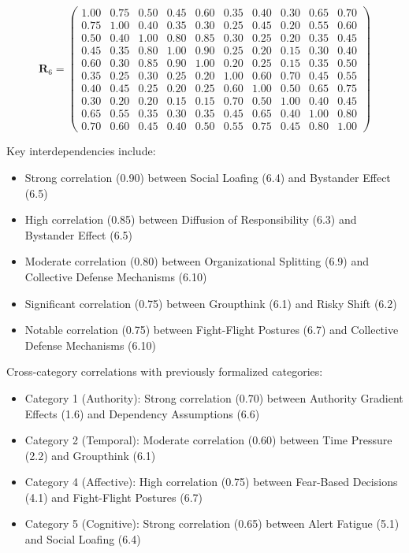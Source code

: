 \documentclass[11pt,a4paper]{article}
\begin{document}
\begin{equation}
\mathbf{R}_6 = \begin{pmatrix}
1.00 & 0.75 & 0.50 & 0.45 & 0.60 & 0.35 & 0.40 & 0.30 & 0.65 & 0.70 \\
0.75 & 1.00 & 0.40 & 0.35 & 0.30 & 0.25 & 0.45 & 0.20 & 0.55 & 0.60 \\
0.50 & 0.40 & 1.00 & 0.80 & 0.85 & 0.30 & 0.25 & 0.20 & 0.35 & 0.45 \\
0.45 & 0.35 & 0.80 & 1.00 & 0.90 & 0.25 & 0.20 & 0.15 & 0.30 & 0.40 \\
0.60 & 0.30 & 0.85 & 0.90 & 1.00 & 0.20 & 0.25 & 0.15 & 0.35 & 0.50 \\
0.35 & 0.25 & 0.30 & 0.25 & 0.20 & 1.00 & 0.60 & 0.70 & 0.45 & 0.55 \\
0.40 & 0.45 & 0.25 & 0.20 & 0.25 & 0.60 & 1.00 & 0.50 & 0.65 & 0.75 \\
0.30 & 0.20 & 0.20 & 0.15 & 0.15 & 0.70 & 0.50 & 1.00 & 0.40 & 0.45 \\
0.65 & 0.55 & 0.35 & 0.30 & 0.35 & 0.45 & 0.65 & 0.40 & 1.00 & 0.80 \\
0.70 & 0.60 & 0.45 & 0.40 & 0.50 & 0.55 & 0.75 & 0.45 & 0.80 & 1.00
\end{pmatrix}
\end{equation}

Key interdependencies include:
\begin{itemize}
\item Strong correlation (0.90) between Social Loafing (6.4) and Bystander Effect (6.5)
\item High correlation (0.85) between Diffusion of Responsibility (6.3) and Bystander Effect (6.5)
\item Moderate correlation (0.80) between Organizational Splitting (6.9) and Collective Defense Mechanisms (6.10)
\item Significant correlation (0.75) between Groupthink (6.1) and Risky Shift (6.2)
\item Notable correlation (0.75) between Fight-Flight Postures (6.7) and Collective Defense Mechanisms (6.10)
\end{itemize}

Cross-category correlations with previously formalized categories:
\begin{itemize}
\item Category 1 (Authority): Strong correlation (0.70) between Authority Gradient Effects (1.6) and Dependency Assumptions (6.6)
\item Category 2 (Temporal): Moderate correlation (0.60) between Time Pressure (2.2) and Groupthink (6.1)
\item Category 4 (Affective): High correlation (0.75) between Fear-Based Decisions (4.1) and Fight-Flight Postures (6.7)
\item Category 5 (Cognitive): Strong correlation (0.65) between Alert Fatigue (5.1) and Social Loafing (6.4)
\end{itemize}
\end{document}
